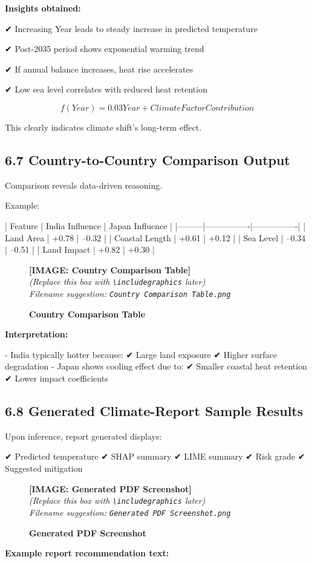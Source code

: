 \documentclass[12pt, a4paper]{article}
\newcommand{\imageplaceholder}[2]{
  \begin{figure}[H]
    \centering
    \begin{tcolorbox}[colback=white, colframe=black, width=0.8\textwidth, arc=0mm, boxrule=1pt]
      \centering
      \vspace{#2}
      \textbf{\Large [IMAGE: #1]}\\
      \vspace{0.5cm}
      \textit{(Replace this box with \texttt{\textbackslash includegraphics} later)}\\
      \textit{Filename suggestion: \texttt{#1.png}}
      \vspace{#2}
    \end{tcolorbox}
    \caption{\textbf{#1}}
    \label{fig:#1}
  \end{figure}
}
\begin{document}
\textbf{Insights obtained:}

✔ Increasing Year leads to steady increase in predicted temperature  

✔ Post-2035 period shows exponential warming trend  

✔ If annual balance increases, heat rise accelerates  

✔ Low sea level correlates with reduced heat retention  

\[
f(Year) = 0.03Year + ClimateFactorContribution
\]

This clearly indicates climate shift's long-term effect.


\subsection{\textbf{6.7 Country-to-Country Comparison Output}}

Comparison reveals data-driven reasoning.

Example:


| Feature | India Influence | Japan Influence |
|---------|----------------|----------------|
| Land Area | +0.78 | –0.32 |
| Coastal Length | +0.61 | +0.12 |
| Sea Level | –0.34 | –0.51 |
| Land Impact | +0.82 | +0.30 |

\imageplaceholder{Country Comparison Table}{5cm}

\textbf{Interpretation:}

- India typically hotter because:
    ✔ Large land exposure  
    ✔ Higher surface degradation  
- Japan shows cooling effect due to:
    ✔ Smaller coastal heat retention  
    ✔ Lower impact coefficients  


\subsection{\textbf{6.8 Generated Climate-Report Sample Results}}

Upon inference, report generated displays:

✔ Predicted temperature  
✔ SHAP summary  
✔ LIME summary  
✔ Risk grade  
✔ Suggested mitigation  

\imageplaceholder{Generated PDF Screenshot}{6cm}

\textbf{Example report recommendation text:}
\end{document}
